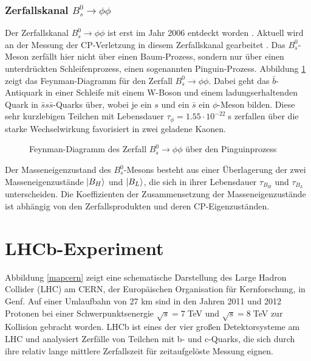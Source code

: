 \documentclass{article}
\begin{document}
\subsubsection{Zerfallskanal $B_s^0\rightarrow \phi \phi$}
Der Zerfallskanal $B_s^0\rightarrow \phi \phi$ ist erst im Jahr 2006 entdeckt worden \cite{first}. Aktuell wird an der Messung der CP-Verletzung in diesem Zerfallskanal gearbeitet \cite{Aaij2013,BensonANANOTE}. Das $B_s^0$-Meson zerfällt hier nicht über einen Baum-Prozess, sondern nur über einen unterdrückten Schleifenprozess, einen sogenannten Pinguin-Prozess. Abbildung \ref{fig:schema} zeigt das Feynman-Diagramm für den Zerfall $B_s^0\rightarrow \phi \phi$. Dabei geht das $\bar{b}$-Antiquark in einer Schleife mit einem W-Boson und einem ladungserhaltenden Quark in $\bar{s}s\bar{s}$-Quarks über, wobei je ein $s$ und ein $\bar{s}$ ein $\phi$-Meson bilden. Diese sehr kurzlebigen Teilchen mit Lebensdauer $\tau_{\phi}=1.55 \cdot 10^{-22}\;$s \cite{PDG} zerfallen über die starke Wechselwirkung favorisiert in zwei geladene Kaonen. 
% 

\begin{figure}[h!]
\centering
\caption{Feynman-Diagramm des Zerfall $B_s^0 \rightarrow \phi \phi$ über den Pinguinprozess}%
\label{fig:schema}
\end{figure} 


Der Masseneigenzustand des $B_s^0$-Mesons besteht aus einer Überlagerung der zwei Masseneigenzustände  $\ket{B_H}$ und $\ket{B_L}$, die sich in ihrer Lebensdauer $\tau_{B_H}$ und $\tau_{B_L}$ unterscheiden. Die Koeffizienten der Zusammensetzung der Masseneigenzustände ist abhängig von den Zerfallsprodukten und deren CP-Eigenzuständen.


\newpage
\section{LHCb-Experiment}
Abbildung \ref{mapcern} zeigt eine schematische Darstellung des Large Hadron Collider (LHC) am CERN, der Europäischen Organisation für Kernforschung, in Genf. Auf einer Umlaufbahn von 27 km sind in den Jahren 2011 und 2012 Protonen bei einer Schwerpunktsenergie $\sqrt{s}=7\;$TeV und $\sqrt{s}=8\;$TeV zur Kollision gebracht worden. LHCb ist eines der vier großen Detektorsysteme am LHC und analysiert Zerfälle von Teilchen mit b- und c-Quarks, die sich durch ihre relativ lange mittlere Zerfallszeit für zeitaufgelöste Messung eignen.%
\end{document}
